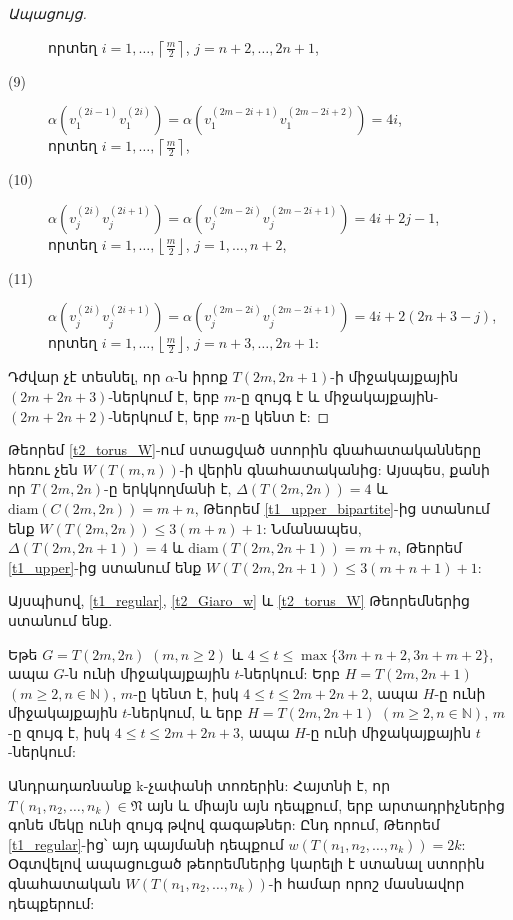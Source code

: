 \begin{proof}[Ապացույց]
\begin{description}
որտեղ $i=1,\ldots,\left\lceil\frac{m}{2}\right\rceil$, $j=n+2,\ldots,2n+1$,
\item[(9)] 
$\alpha\left(v_{1}^{(2i-1)}v_{1}^{(2i)}\right)=\alpha\left(v_{1}^{(2m-2i+1)}v_{1}^{(2m-2i+2)}\right)=4i$, \\ որտեղ $i=1,\ldots,\left\lceil\frac{m}{2}\right\rceil$,
\item[(10)] 
$\alpha\left(v_{j}^{(2i)}v_{j}^{(2i+1)}\right)=\alpha\left(v_{j}^{(2m-2i)}v_{j}^{(2m-2i+1)}\right)=4i+2j-1$, \\
որտեղ $i=1,\ldots,\left\lfloor\frac{m}{2}\right\rfloor$, $j=1,\ldots,n+2$,
\item[(11)] 
$\alpha\left(v_{j}^{(2i)}v_{j}^{(2i+1)}\right)=\alpha\left(v_{j}^{(2m-2i)}v_{j}^{(2m-2i+1)}\right)=4i+2(2n+3-j)$,\\ 
որտեղ $i=1,\ldots,\left\lfloor\frac{m}{2}\right\rfloor$, $j=n+3,\ldots,2n+1$:
\end{description}
Դժվար չէ տեսնել, որ $\alpha$-ն իրոք $T(2m,2n+1)$-ի միջակայքային $(2m+2n+3)$-ներկում է, երբ $m$-ը զույգ է և միջակայքային-$(2m+2n+2)$-ներկում է, երբ $m$-ը կենտ է:
\end{proof}

Թեորեմ \ref{t2_torus_W}-ում ստացված ստորին գնահատականները հեռու չեն $W\left(T(m,n)\right)$-ի վերին գնահատականից: Այսպես, քանի որ $T(2m,2n)$-ը երկկողմանի է, $\Delta\left(T(2m,2n)\right)=4$ և $\mathrm{diam}\left(C(2m,2n)\right)=m+n$, Թեորեմ
\ref{t1_upper_bipartite}-ից ստանում ենք $W\left(T(2m,2n)\right)\leq 3(m+n)+1$: Նմանապես, $\Delta\left(T(2m,2n+1)\right)=4$ և $\mathrm{diam}\left(T(2m,2n+1)\right)=m+n$, Թեորեմ \ref{t1_upper}-ից ստանում ենք $W\left(T(2m,2n+1)\right)\leq 3(m+n+1)+1$:

Այսպիսով, \ref{t1_regular}, \ref{t2_Giaro_w} և \ref{t2_torus_W} Թեորեմներից ստանում ենք.

\begin{corollary}
\label{t2_torus} Եթե $G=T(2m,2n)$ $(m,n\geq 2)$ և $4\leq t\leq \max\{3m+n+2,3n+m+2\}$, ապա $G$-ն ունի միջակայքային $t$-ներկում: Երբ $H=T(2m,2n+1)$ $(m\geq 2, n\in\mathbb{N})$, $m$-ը կենտ է, իսկ $4\leq t\leq 2m+2n+2$, ապա $H$-ը ունի միջակայքային $t$-ներկում, և երբ $H=T(2m,2n+1)$ $(m\geq 2, n\in\mathbb{N})$, $m$-ը զույգ է, իսկ $4\leq t\leq 2m+2n+3$, ապա $H$-ը ունի միջակայքային $t$-ներկում:
\end{corollary}

Անդրադառնանք k-չափանի տոռերին: Հայտնի է, որ $T\left(n_1,n_2,\ldots,n_k\right) \in \mathfrak{N}$ այն և միայն այն դեպքում, երբ արտադրիչներից գոնե մեկը ունի զույգ թվով գագաթներ: Ընդ որում, Թեորեմ \ref{t1_regular}-ից՝ այդ պայմանի դեպքում $w\left(T\left(n_1,n_2,\ldots,n_k\right)\right)=2k$: Օգտվելով ապացուցած թեորեմներից կարելի է ստանալ ստորին գնահատական $W\left(T\left(n_1,n_2,\ldots,n_k\right)\right)$-ի համար որոշ մասնավոր դեպքերում:

